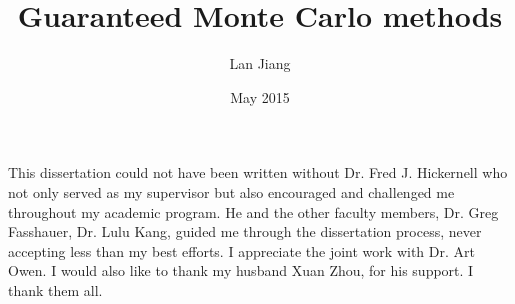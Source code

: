 \documentclass{iitthesis}
\begin{document}

\title{Guaranteed Monte Carlo methods}
\author{Lan Jiang}
 
\date{May 2015}
\maketitle                %


\prelimpages         %


\begin{acknowledgement}     %
\par  This dissertation could not have been written without Dr. Fred
J. Hickernell who not only served as my supervisor but also
encouraged and challenged me throughout my academic program. He and
the other faculty members, Dr. Greg Fasshauer,
Dr. Lulu Kang, guided me through the dissertation process,
never accepting less than my best efforts. I appreciate the joint
work with Dr. Art Owen. I would
also like to thank my husband Xuan Zhou, for his support. I thank them all.

\end{acknowledgement}


\tableofcontents
 \clearpage

\listoftables

\clearpage

\listoffigures

\clearpage



\begin{abstract}           %

\end{abstract}

\textpages     %

\label{introduction}



\end{document}
